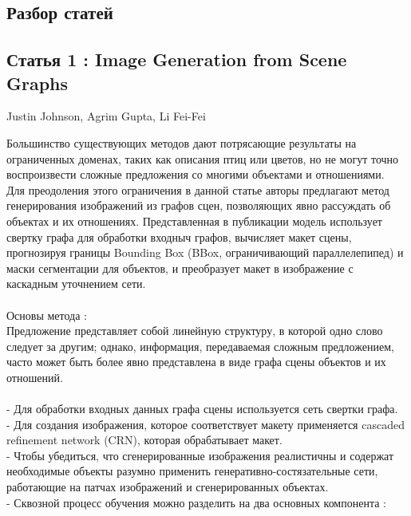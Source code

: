 \documentclass{article}
\begin{document}
    \newpage
    \begin{center} 
    \section{Разбор статей}
    \subsection{Статья 1 : Image Generation from Scene Graphs}
      \huge Justin Johnson, Agrim Gupta, Li Fei-Fei\\ [1.3cm]
    \end{center} 
      \large Большинство существующих методов дают потрясающие результаты на ограниченных доменах, таких
как описания птиц или цветов, но не могут точно воспроизвести
сложные предложения со многими объектами и отношениями.\\
Для преодоления этого ограничения в данной статье авторы предлагают метод
генерирования изображений из графов сцен, позволяющих явно рассуждать об
объектах и их отношениях. Представленная в публикации модель использует свертку графа для
обработки входныч графов, вычисляет макет сцены, прогнозируя границы
Bounding Box (BBox, ограничивающий параллелепипед) и маски сегментации для объектов, и преобразует макет в
изображение с каскадным уточнением сети.\\ \\
Основы метода :\\
Предложение представляет собой линейную структуру, в которой одно слово следует за другим; однако,
информация, передаваемая сложным предложением, часто может быть более явно представлена в виде графа сцены
объектов и их отношений.\\ \\
 - Для обработки входных данных графа сцены используется сеть свертки графа.\\
 - Для создания изображения, которое соответствует макету применяется cascaded refinement network (CRN), которая
обрабатывает макет.\\
 - Чтобы убедиться, что сгенерированные изображения реалистичны и содержат необходимые объекты разумно применить
генеративно-состязательные сети, работающие на патчах изображений и сгенерированных объектах.\\
 - Сквозной процесс обучения можно разделить на два основных компонента :\\ 
\end{document}
